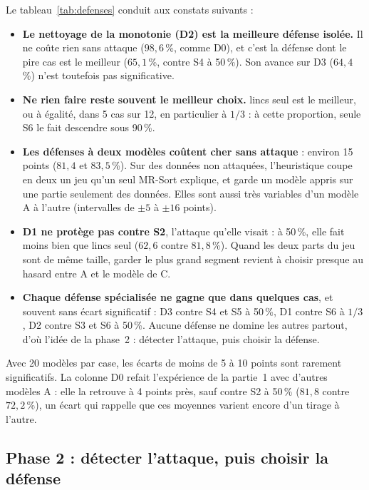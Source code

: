 \documentclass[11pt,a4paper]{article}
\begin{document}
Le tableau~\ref{tab:defenses} conduit aux constats suivants :
\begin{itemize}
  \item \textbf{Le nettoyage de la monotonie (D2) est la meilleure défense isolée.} Il ne coûte rien sans attaque
        ($98{,}6$\,\%, comme D0), et c'est la défense dont le pire cas est le meilleur ($65{,}1$\,\%, contre S4 à
        50\,\%). Son avance sur D3 ($64{,}4$\,\%) n'est toutefois pas significative.
  \item \textbf{Ne rien faire reste souvent le meilleur choix.} lincs seul est le meilleur, ou à égalité, dans 5 cas
        sur 12, en particulier à $1/3$ : à cette proportion, seule S6 le fait descendre sous 90\,\%.
  \item \textbf{Les défenses à deux modèles coûtent cher sans attaque} : environ 15 points ($81{,}4$ et
        $83{,}5$\,\%). Sur des données non attaquées, l'heuristique coupe en deux un jeu qu'un seul MR-Sort explique,
        et garde un modèle appris sur une partie seulement des données. Elles sont aussi très variables d'un modèle
        A à l'autre (intervalles de $\pm 5$ à $\pm 16$ points).
  \item \textbf{D1 ne protège pas contre S2}, l'attaque qu'elle visait : à 50\,\%, elle fait moins bien que lincs seul
        ($62{,}6$ contre $81{,}8$\,\%). Quand les deux parts du jeu sont de même taille, garder le plus grand segment
        revient à choisir presque au hasard entre A et le modèle de C.
  \item \textbf{Chaque défense spécialisée ne gagne que dans quelques cas}, et souvent sans écart significatif : D3
        contre S4 et S5 à 50\,\%, D1 contre S6 à $1/3$, D2 contre S3 et S6 à 50\,\%. Aucune défense ne domine les
        autres partout, d'où l'idée de la phase~2 : détecter l'attaque, puis choisir la défense.
\end{itemize}
Avec 20 modèles par case, les écarts de moins de 5 à 10 points sont rarement significatifs. La colonne D0 refait
l'expérience de la partie~1 avec d'autres modèles A : elle la retrouve à 4 points près, sauf contre S2 à 50\,\%
($81{,}8$ contre $72{,}2$\,\%), un écart qui rappelle que ces moyennes varient encore d'un tirage à l'autre.

\subsection{Phase 2 : détecter l'attaque, puis choisir la défense}
\end{document}
